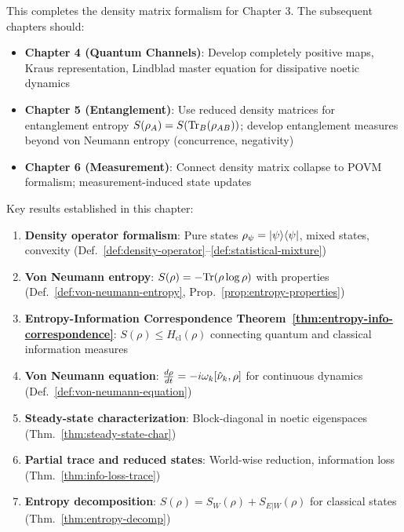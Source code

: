 \begin{tcolorbox}[colback=green!5!white,colframe=green!50!black,title=\textbf{Handoff: Next Steps},breakable]
This completes the density matrix formalism for Chapter 3. The subsequent chapters should:
\begin{itemize}
  \item \textbf{Chapter 4 (Quantum Channels)}: Develop completely positive maps, Kraus representation, Lindblad master equation for dissipative noetic dynamics
  \item \textbf{Chapter 5 (Entanglement)}: Use reduced density matrices for entanglement entropy $S(\rho_A) = S(\mathrm{Tr}_B(\rho_{AB}))$; develop entanglement measures beyond von Neumann entropy (concurrence, negativity)
  \item \textbf{Chapter 6 (Measurement)}: Connect density matrix collapse to POVM formalism; measurement-induced state updates
\end{itemize}

Key results established in this chapter:
\begin{enumerate}
  \item \textbf{Density operator formalism}: Pure states $\rho_\psi = |\psi\rangle\langle \psi|$, mixed states, convexity (Def.~\ref{def:density-operator}--\ref{def:statistical-mixture})
  \item \textbf{Von Neumann entropy}: $S(\rho) = -\mathrm{Tr}(\rho \log \rho)$ with properties (Def.~\ref{def:von-neumann-entropy}, Prop.~\ref{prop:entropy-properties})
  \item \textbf{Entropy-Information Correspondence Theorem~\ref{thm:entropy-info-correspondence}}: $S(\rho) \leq H_{\mathrm{cl}}(\rho)$ connecting quantum and classical information measures
  \item \textbf{Von Neumann equation}: $\frac{d\rho}{dt} = -i\omega_k[\hat{\nu}_k, \rho]$ for continuous dynamics (Def.~\ref{def:von-neumann-equation})
  \item \textbf{Steady-state characterization}: Block-diagonal in noetic eigenspaces (Thm.~\ref{thm:steady-state-char})
  \item \textbf{Partial trace and reduced states}: World-wise reduction, information loss (Thm.~\ref{thm:info-loss-trace})
  \item \textbf{Entropy decomposition}: $S(\rho) = S_W(\rho) + S_{E|W}(\rho)$ for classical states (Thm.~\ref{thm:entropy-decomp})
\end{enumerate}
\end{tcolorbox}

